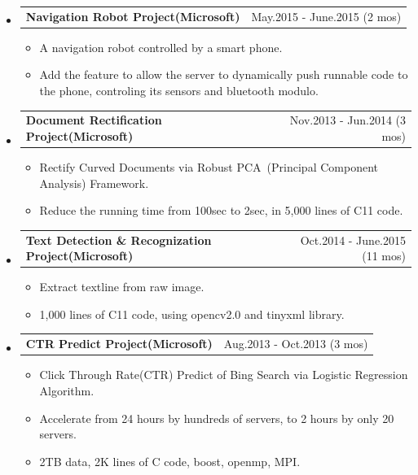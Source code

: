 \documentclass[a4paper,11pt]{article}
\makeatletter
\newcommand{\ressubheadingsingleline}[2]{
    \begin{tabular*}{6.5in}{l@{\extracolsep{\fill}}r}
        \textbf{#1} & #2 \\
    \end{tabular*}\vspace{-6pt}
}
\newcommand{\CC}{C\nolinebreak\hspace{-.05em}\raisebox{.4ex}{\tiny\bf +}\nolinebreak\hspace{-.10em}\raisebox{.4ex}{\tiny\bf +}}
\newcommand{\CS}{C\nolinebreak\hspace{-.05em}\raisebox{.6ex}{\scriptsize\bf{\#}}}
\makeatother
\begin{document}
\begin{itemize} \setlength{\itemsep}{-3pt}
    \item
        \ressubheadingsingleline{Navigation Robot Project(Microsoft)}{May.2015 - June.2015 (2 mos)}
            \begin{itemize}
                \item A navigation robot controlled by a smart phone.
                \item Add the feature to allow the server to dynamically push runnable code to the phone, controling its sensors and bluetooth modulo.
            \end{itemize}
	\item 
		\ressubheadingsingleline{Document Rectification Project(Microsoft)}{Nov.2013 - Jun.2014 (3 mos)}
			\begin{itemize} \setlength{\itemsep}{0pt}
				\item Rectify Curved Documents 
					via Robust PCA\
					(Principal Component Analysis) Framework.
				\item Reduce the running time from 100sec to 2sec, in 5,000 lines of \CC{}11 code.
			\end{itemize} 
	\item
		\ressubheadingsingleline{Text Detection \& Recognization Project(Microsoft)}{Oct.2014 - June.2015 (11 mos)}
            \begin{itemize}
                \item Extract textline from raw image.
                \item 1,000 lines of \CC{}11 code, using opencv2.0 and tinyxml library. 
            \end{itemize}
	\item 
		\ressubheadingsingleline{CTR Predict Project(Microsoft)}{Aug.2013 - Oct.2013 (3 mos)}
			\begin{itemize} \setlength{\itemsep}{0pt}
				\item Click Through Rate(CTR) Predict of Bing Search
					via Logistic Regression Algorithm.
				\item Accelerate from 24 hours by hundreds of 
					servers, 
					to 2 hours by only 20 servers.  
				\item 2TB data, 2K lines of \CC{} code, boost, openmp, MPI.
			\end{itemize}
\end{itemize}
\end{document}
